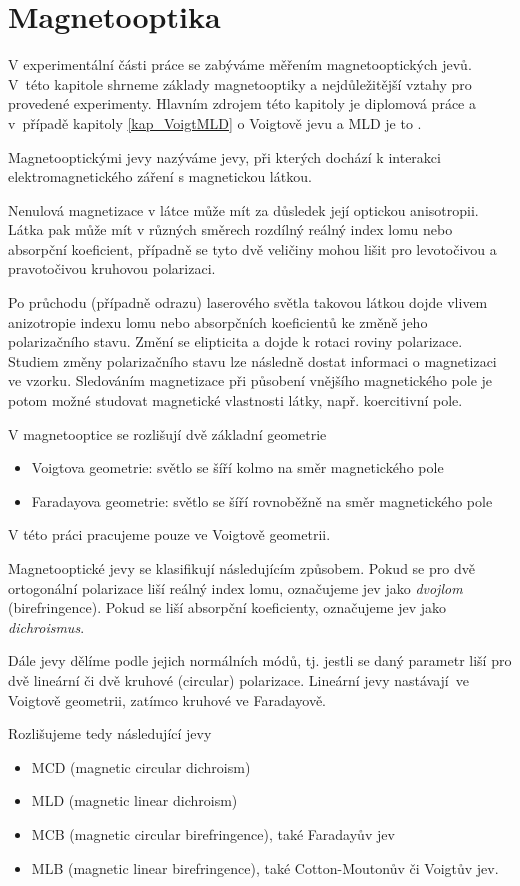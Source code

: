 \chapter{Magnetooptika}
V experimentální části práce se zabýváme měřením magnetooptických jevů. V~této kapitole shrneme základy magnetooptiky a nejdůležitější vztahy pro provedené experimenty. Hlavním zdrojem této kapitoly je diplomová práce \cite{Subrt} a v~případě kapitoly \ref{kap_VoigtMLD} o Voigtově jevu a MLD je to \cite{Tesarova}.

Magnetooptickými jevy nazýváme jevy, při kterých dochází k interakci elektromagnetického záření s magnetickou látkou. 

Nenulová magnetizace v látce může mít za důsledek její optickou anisotropii. Látka pak může mít v různých směrech rozdílný reálný index lomu nebo absorpční koeficient, případně se tyto dvě veličiny mohou lišit pro levotočivou a pravotočivou kruhovou polarizaci.

Po průchodu (případně odrazu) laserového světla takovou látkou dojde vlivem anizotropie indexu lomu nebo absorpčních koeficientů ke změně jeho polarizačního stavu. Změní se elipticita a dojde k rotaci roviny polarizace. Studiem změny polarizačního stavu lze následně dostat informaci o magnetizaci ve vzorku. Sledováním magnetizace při působení vnějšího magnetického pole je potom možné studovat magnetické vlastnosti látky, např. koercitivní pole.

V magnetooptice se rozlišují dvě základní geometrie
\begin{itemize}
	\item Voigtova geometrie: světlo se šíří kolmo na směr magnetického pole
	\item Faradayova geometrie: světlo se šíří rovnoběžně na směr magnetického pole
\end{itemize}
V této práci pracujeme pouze ve Voigtově geometrii.


Magnetooptické jevy se klasifikují následujícím způsobem. Pokud se pro dvě ortogonální polarizace liší reálný index lomu, označujeme jev jako \emph{dvojlom} (birefringence). Pokud se liší absorpční koeficienty, označujeme jev jako \emph{dichroismus}. 

Dále jevy dělíme podle jejich normálních módů, tj. jestli se daný parametr liší pro dvě lineární či dvě kruhové (circular) polarizace. Lineární jevy nastávají~ve Voigtově geometrii, zatímco kruhové ve Faradayově. 

Rozlišujeme tedy následující jevy
\begin{itemize}
	\item MCD (magnetic circular dichroism)
	\item MLD (magnetic linear dichroism)
	\item MCB (magnetic circular birefringence), také Faradayův jev
	\item MLB (magnetic linear birefringence), také Cotton-Moutonův či Voigtův jev.
\end{itemize} 

